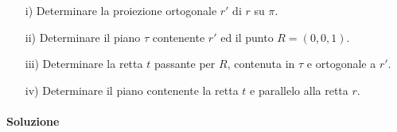 \documentclass{article}
\theoremstyle{plain}
\theoremstyle{definition}
\theoremstyle{remark}
\begin{document}
\begin{enumerate}
\begin{enumerate}
    \item[i)] Determinare la proiezione ortogonale $r'$ di $r$ su $\pi$.
    \item[ii)] Determinare il piano $\tau$ contenente $r'$ ed il punto $R = (0, 0, 1)$.
    \item[iii)] Determinare la retta $t$ passante per $R$, contenuta in $\tau$ e ortogonale a $r'$.
    \item[iv)] Determinare il piano contenente la retta $t$ e parallelo alla retta $r$.
\end{enumerate}
\end{enumerate}

\vspace{10pt}

\paragraph{Soluzione}
\end{document}
